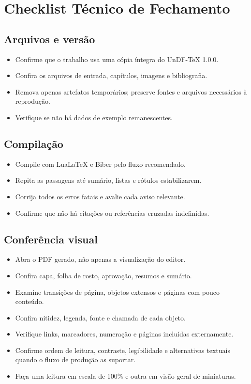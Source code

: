 \chapter{Checklist Técnico de Fechamento}

\section{Arquivos e versão}

\begin{itemize}[label=$\square$]
  \item Confirme que o trabalho usa uma cópia íntegra do UnDF-TeX 1.0.0.
  \item Confira os arquivos de entrada, capítulos, imagens e bibliografia.
  \item Remova apenas artefatos temporários; preserve fontes e arquivos necessários à reprodução.
  \item Verifique se não há dados de exemplo remanescentes.
\end{itemize}

\section{Compilação}

\begin{itemize}[label=$\square$]
  \item Compile com LuaLaTeX e Biber pelo fluxo recomendado.
  \item Repita as passagens até sumário, listas e rótulos estabilizarem.
  \item Corrija todos os erros fatais e avalie cada aviso relevante.
  \item Confirme que não há citações ou referências cruzadas indefinidas.
\end{itemize}

\section{Conferência visual}

\begin{itemize}[label=$\square$]
  \item Abra o PDF gerado, não apenas a visualização do editor.
  \item Confira capa, folha de rosto, aprovação, resumos e sumário.
  \item Examine transições de página, objetos extensos e páginas com pouco conteúdo.
  \item Confira nitidez, legenda, fonte e chamada de cada objeto.
  \item Verifique links, marcadores, numeração e páginas incluídas externamente.
  \item Confirme ordem de leitura, contraste, legibilidade e alternativas textuais quando o fluxo de produção as suportar.
  \item Faça uma leitura em escala de 100\% e outra em visão geral de miniaturas.
\end{itemize}

